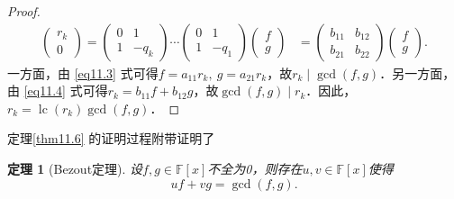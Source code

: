 \documentclass[a4paper,fontset=windows]{ctexbook}
\newtheorem{theorem}{定理}[chapter]
\theoremstyle{definition}
\DeclareMathOperator{\lc}{lc}
\begin{document}
\begin{proof}
\begin{align}
\begin{pmatrix}r_k \\ 0\end{pmatrix}=\begin{pmatrix}0&1 \\ 1&-q_k\end{pmatrix}\cdots\begin{pmatrix}0&1 \\ 1&-q_1\end{pmatrix}\begin{pmatrix}f \\ g\end{pmatrix}&=\begin{pmatrix}b_{11}&b_{12} \\ b_{21}&b_{22}\end{pmatrix}\begin{pmatrix}f \\ g\end{pmatrix}.\label{eq11.4}
\end{align}
一方面，由 \eqref{eq11.3} 式可得$f=a_{11}r_k,~g=a_{21}r_k$，故$r_k\mid\gcd(f,g)$．另一方面，由 \eqref{eq11.4} 式可得$r_k=b_{11}f+b_{12}g$，故$\gcd(f,g)\mid r_k$．因此，$r_k=\lc(r_k)\gcd(f,g)$．
\end{proof}

定理\ref{thm11.6} 的证明过程附带证明了

\begin{theorem}[Bezout定理]
设$f,g\in\mathbb{F}[x]$不全为0，则存在$u,v\in\mathbb{F}[x]$使得
\begin{equation}\label{eq11.5}
uf+vg=\gcd(f,g).
\end{equation}
\end{theorem}
\end{document}
